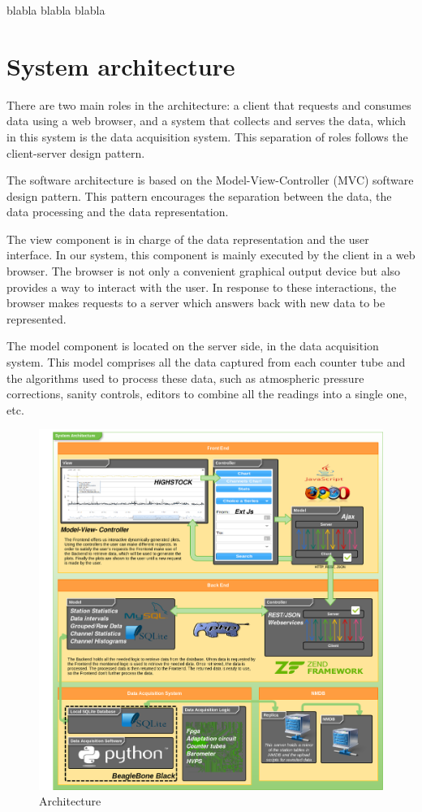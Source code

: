 \documentclass[a4paper]{jpconf}
\begin{document}
blabla \cite{Medina2013}
blabla \cite{NMDB2011}
blabla \cite{Forbush1938}

\section{System architecture}

There are two main roles in the architecture: a client that requests and
consumes data using a web browser, and a system that collects and serves the
data, which in this system is the data acquisition system\cite{Garcia2014}. This
separation of roles follows the client-server design
pattern\cite{wiki:ClientServer}.

The software architecture is based on the Model-View-Controller (MVC) software
design pattern\cite{wiki:MVC}. This pattern encourages the separation between
the data, the data processing and the data representation. 

The view component is in charge of the data representation and the user
interface. In our system, this component is mainly executed by the client in a
web browser. The browser is not only a convenient graphical output device but
also provides a way to interact with the user. In response to these
interactions, the browser makes requests to a server which answers back with new
data to be represented.

The model component is located on the server side, in the data acquisition
system. This model comprises all the data captured from each counter tube and
the algorithms used to process these data, such as atmospheric pressure
corrections, sanity controls, editors to combine all the readings into a single
one, etc.

\begin{figure}[h]
    \centering
    \includegraphics[keepaspectratio, width=1\textwidth]{./resources/Architecture.png}
    \caption{Architecture}
    \label{fig:arch}
\end{figure}
\end{document}
